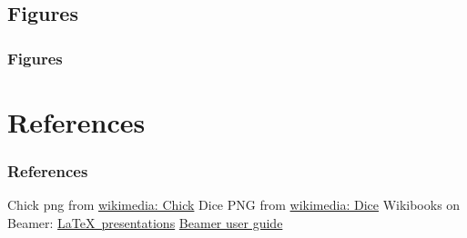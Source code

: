 \documentclass{beamer}
\begin{document}
		\subsection{Figures}
		\begin{frame}
			\frametitle{Figures}
				
		\end{frame}
		
\section{References}
		\begin{frame}
			\frametitle{References}		
				\begin{thebibliography}{99}\small
				Chick png from \href{http://commons.wikimedia.org/wiki/File:Chick1.png}{wikimedia: Chick}
				Dice PNG from \href{http://commons.wikimedia.org/wiki/File:PNG_transparency_demonstration_1.png}{wikimedia: Dice}
			Wikibooks on Beamer: \href{http://en.wikibooks.org/wiki/LaTeX/Presentations}{\LaTeX\ presentations}
			\href{http://dante.ctan.org/get/macros/latex/contrib/beamer/doc/beameruserguide.pdf}{Beamer user guide}
	 \end{thebibliography}
		\end{frame}
\end{document}
